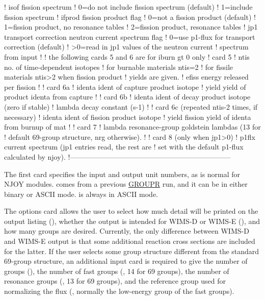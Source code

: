 \begin{ccode}
   !    isof    fission spectrum
   !               0=do not include fission spectrum (default)
   !               1=include fission spectrum
   !    ifprod  fission product flag
   !               0=not a fission product (default)
   !               1=fission product, no resonance tables
   !               2=fission product, resonance tables
   !    jp1     transport correction neutron current spectrum flag
   !               0=use p1-flux for transport correction (default)
   !              >0=read in jp1 values of the neutron current
   !                   spectrum from input
   !
   !   the following cards 5 and 6 are for iburn gt 0 only
   ! card  5
   !    ntis    no. of time-dependent isotopes
   !            for burnable materials ntis=2
   !            for fissile materials ntis>2 when fission product
   !            yields are given.
   !    efiss   energy released per fission
   !
   ! card  6a
   !    identa  ident of capture product isotope
   !    yield   yield of product identa from capture
   !
   ! card  6b
   !    identa  ident of decay product isotope (zero if stable)
   !    lambda  decay constant (s-1)
   !
   ! card  6c  (repeated ntis-2 times, if necessary)
   !    identa  ident of fission product isotope
   !    yield   fission yield of identa from burnup of mat
   !
   ! card  7
   !    lambda  resonance-group goldstein lambdas (13 for
   !            default 69-group structure, nrg otherwise).
   !
   ! card  8    (only when jp1>0)
   !    p1flx   current spectrum (jp1 entries read, the rest are
   !            set with the default p1-flux calculated by njoy).
   !--------------------------------------------------------------------

\end{ccode}
\normalsize

The first card specifies the input and output unit numbers, as
is normal for NJOY modules.   comes from a previous
\hyperlink{sGROUPRhy}{GROUPR} run, and it can be in
either binary or ASCII mode.
 is always in ASCII mode.

The options card allows the user to select how much detail will
be printed on the output listing (), whether the
output is intended for  WIMS-D or WIMS-E (), and how
many groups are desired.  Currently, the only difference between
WIMS-D and WIMS-E output is that some additional reaction cross
sections are included for the latter.  If the user selects some
group structure different from the standard 69-group structure,
an additional input card is required to give the number of groups
(), the number of fast groups (, 14 for
69 groups), the number of resonance groups (, 13 for
69 groups), and the reference group used for normalizing the
flux (, normally the low-energy group of the
fast groups).

